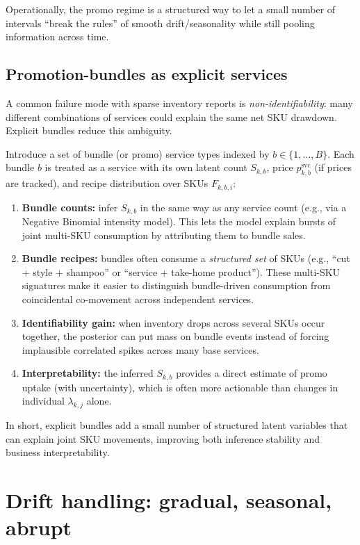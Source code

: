\documentclass[11pt]{article}
\begin{document}
Operationally, the promo regime is a structured way to let a small number of intervals ``break the rules'' of smooth drift/seasonality while still pooling information across time.

\subsection{Promotion-bundles as explicit services}

A common failure mode with sparse inventory reports is \emph{non-identifiability}: many different combinations of services could explain the same net SKU drawdown.
Explicit bundles reduce this ambiguity.

Introduce a set of bundle (or promo) service types indexed by $b\in\{1,\dots,B\}$.
Each bundle $b$ is treated as a service with its own latent count $S_{k,b}$, price $p^{\mathrm{svc}}_{k,b}$ (if prices are tracked), and recipe distribution over SKUs $F_{k,b,i}$:
\begin{enumerate}
  \item \textbf{Bundle counts:} infer $S_{k,b}$ in the same way as any service count (e.g., via a Negative Binomial intensity model). This lets the model explain bursts of joint multi-SKU consumption by attributing them to bundle sales.

  \item \textbf{Bundle recipes:} bundles often consume a \emph{structured set} of SKUs (e.g., ``cut + style + shampoo'' or ``service + take-home product''). These multi-SKU signatures make it easier to distinguish bundle-driven consumption from coincidental co-movement across independent services.

  \item \textbf{Identifiability gain:} when inventory drops across several SKUs occur together, the posterior can put mass on bundle events instead of forcing implausible correlated spikes across many base services.

  \item \textbf{Interpretability:} the inferred $S_{k,b}$ provides a direct estimate of promo uptake (with uncertainty), which is often more actionable than changes in individual $\lambda_{k,j}$ alone.
\end{enumerate}

In short, explicit bundles add a small number of structured latent variables that can explain joint SKU movements, improving both inference stability and business interpretability.

\section{Drift handling: gradual, seasonal, abrupt}
\end{document}
